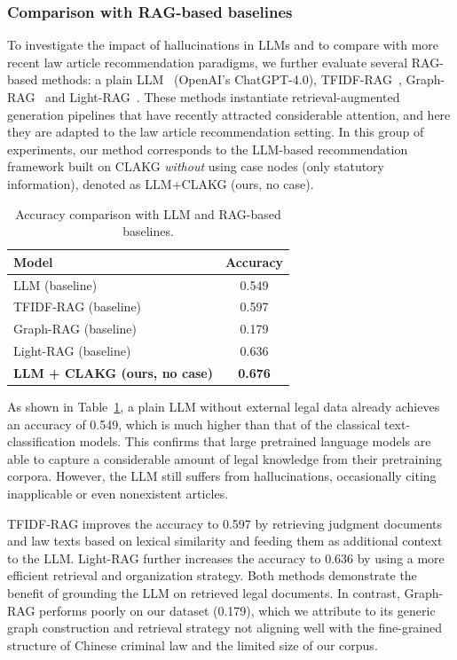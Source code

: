 \documentclass[review,times,nonatbib]{elsarticle} %
\begin{document}
\subsubsection{Comparison with RAG-based baselines}

To investigate the impact of hallucinations in LLMs and to compare with more recent law article recommendation paradigms, we further evaluate several RAG-based methods: a plain LLM~\cite{openai2023chatgpt} (OpenAI's ChatGPT-4.0), TFIDF-RAG~\cite{aizawa2003information}, Graph-RAG~\cite{edge2024from} and Light-RAG~\cite{guo2024lightragsimplefastretrievalaugmented}. These methods instantiate retrieval-augmented generation pipelines that have recently attracted considerable attention, and here they are adapted to the law article recommendation setting. In this group of experiments, our method corresponds to the LLM-based recommendation framework built on CLAKG \emph{without} using case nodes (only statutory information), denoted as LLM+CLAKG (ours, no case).

\begin{table}[h]
\centering
\caption{Accuracy comparison with LLM and RAG-based baselines.}
\label{tab:model_accuracy_comparison2}
\begin{tabular}{l|c}
\hline
\textbf{Model} & \textbf{Accuracy} \\ \hline
LLM (baseline) & 0.549 \\ \hline
TFIDF-RAG (baseline) & 0.597 \\ \hline
Graph-RAG (baseline) & 0.179 \\ \hline
Light-RAG (baseline) & 0.636 \\ \hline
\textbf{LLM + CLAKG (ours, no case)} & \textbf{0.676} \\ \hline
\end{tabular}
\end{table}

As shown in Table~\ref{tab:model_accuracy_comparison2}, a plain LLM without external legal data already achieves an accuracy of 0.549, which is much higher than that of the classical text-classification models. This confirms that large pretrained language models are able to capture a considerable amount of legal knowledge from their pretraining corpora. However, the LLM still suffers from hallucinations, occasionally citing inapplicable or even nonexistent articles.

TFIDF-RAG improves the accuracy to 0.597 by retrieving judgment documents and law texts based on lexical similarity and feeding them as additional context to the LLM. Light-RAG further increases the accuracy to 0.636 by using a more efficient retrieval and organization strategy. Both methods demonstrate the benefit of grounding the LLM on retrieved legal documents. In contrast, Graph-RAG performs poorly on our dataset (0.179), which we attribute to its generic graph construction and retrieval strategy not aligning well with the fine-grained structure of Chinese criminal law and the limited size of our corpus.
\end{document}
